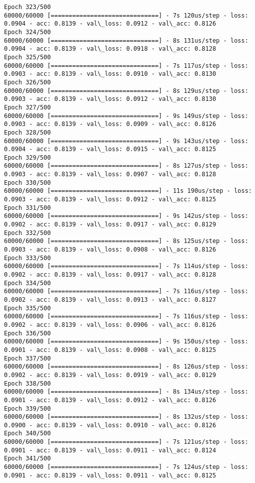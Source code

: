 \documentclass[11pt]{article}
\begin{document}
\begin{Verbatim}[commandchars=\\\{\}]
Epoch 323/500
60000/60000 [==============================] - 7s 120us/step - loss: 0.0904 - acc: 0.8139 - val\_loss: 0.0912 - val\_acc: 0.8126
Epoch 324/500
60000/60000 [==============================] - 8s 131us/step - loss: 0.0904 - acc: 0.8139 - val\_loss: 0.0918 - val\_acc: 0.8128
Epoch 325/500
60000/60000 [==============================] - 7s 117us/step - loss: 0.0903 - acc: 0.8139 - val\_loss: 0.0910 - val\_acc: 0.8130
Epoch 326/500
60000/60000 [==============================] - 8s 129us/step - loss: 0.0903 - acc: 0.8139 - val\_loss: 0.0912 - val\_acc: 0.8130
Epoch 327/500
60000/60000 [==============================] - 9s 149us/step - loss: 0.0903 - acc: 0.8139 - val\_loss: 0.0909 - val\_acc: 0.8126
Epoch 328/500
60000/60000 [==============================] - 9s 143us/step - loss: 0.0904 - acc: 0.8139 - val\_loss: 0.0915 - val\_acc: 0.8125
Epoch 329/500
60000/60000 [==============================] - 8s 127us/step - loss: 0.0903 - acc: 0.8139 - val\_loss: 0.0907 - val\_acc: 0.8128
Epoch 330/500
60000/60000 [==============================] - 11s 190us/step - loss: 0.0903 - acc: 0.8139 - val\_loss: 0.0912 - val\_acc: 0.8125
Epoch 331/500
60000/60000 [==============================] - 9s 142us/step - loss: 0.0902 - acc: 0.8139 - val\_loss: 0.0917 - val\_acc: 0.8129
Epoch 332/500
60000/60000 [==============================] - 8s 125us/step - loss: 0.0903 - acc: 0.8139 - val\_loss: 0.0908 - val\_acc: 0.8126
Epoch 333/500
60000/60000 [==============================] - 7s 114us/step - loss: 0.0902 - acc: 0.8139 - val\_loss: 0.0917 - val\_acc: 0.8128
Epoch 334/500
60000/60000 [==============================] - 7s 116us/step - loss: 0.0902 - acc: 0.8139 - val\_loss: 0.0913 - val\_acc: 0.8127
Epoch 335/500
60000/60000 [==============================] - 7s 116us/step - loss: 0.0902 - acc: 0.8139 - val\_loss: 0.0906 - val\_acc: 0.8126
Epoch 336/500
60000/60000 [==============================] - 9s 150us/step - loss: 0.0901 - acc: 0.8139 - val\_loss: 0.0908 - val\_acc: 0.8125
Epoch 337/500
60000/60000 [==============================] - 8s 126us/step - loss: 0.0902 - acc: 0.8139 - val\_loss: 0.0919 - val\_acc: 0.8129
Epoch 338/500
60000/60000 [==============================] - 8s 134us/step - loss: 0.0901 - acc: 0.8139 - val\_loss: 0.0912 - val\_acc: 0.8126
Epoch 339/500
60000/60000 [==============================] - 8s 132us/step - loss: 0.0900 - acc: 0.8139 - val\_loss: 0.0910 - val\_acc: 0.8126
Epoch 340/500
60000/60000 [==============================] - 7s 121us/step - loss: 0.0901 - acc: 0.8139 - val\_loss: 0.0911 - val\_acc: 0.8124
Epoch 341/500
60000/60000 [==============================] - 7s 124us/step - loss: 0.0901 - acc: 0.8139 - val\_loss: 0.0911 - val\_acc: 0.8125

\end{Verbatim}
\end{document}
